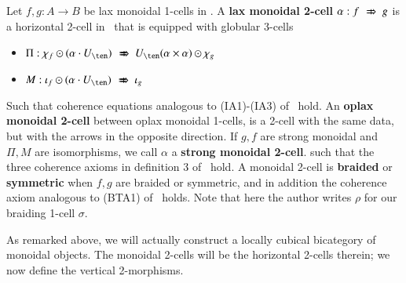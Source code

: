 \begin{defn}\label{Def:monverttrans}
Let $f, g:A \rightarrow B$ be lax monoidal 1-cells in \fB. A {\bf lax monoidal 2-cell} $\alpha: f \xslashedRightarrow{} g$ is a horizontal 2-cell in \fB\ that is equipped with globular 3-cells
\begin{itemize}
\item $\Pi: \chi_f \horc (\alpha \comp U_{\ten}) \xslashedRightarrow{} U_{\ten}(\alpha \times \alpha) \horc \chi_g$
\item $M: \iota_f \horc (\alpha \comp U_{\ten}) \xslashedRightarrow{} \iota_g$
\end{itemize}

Such that coherence equations analogous to (IA1)-(IA3) of~\cite{gg:ldstr-tricat} hold.
An {\bf oplax monoidal 2-cell} between oplax monoidal 1-cells, is a 2-cell with the same data, but with the arrows in the opposite direction. If $g,f$ are strong monoidal and $\Pi, M$ are isomorphisms, we call $\alpha$ a {\bf strong monoidal 2-cell}.
such that the three coherence axioms in definition 3 of~\cite{gg:ldstr-tricat} hold.
A monoidal 2-cell is {\bf braided} or {\bf symmetric} when $f,g$ are braided or symmetric, and in addition the coherence axiom analogous to (BTA1) of~\cite[p143]{mccrudden:bal-coalgb} holds. Note that here the author writes $\rho$ for our braiding 1-cell $\sigma$.
\end{defn}

As remarked above, we will actually construct a locally cubical bicategory of monoidal objects.
The monoidal 2-cells will be the horizontal 2-cells therein; we now define the vertical 2-morphisms.

